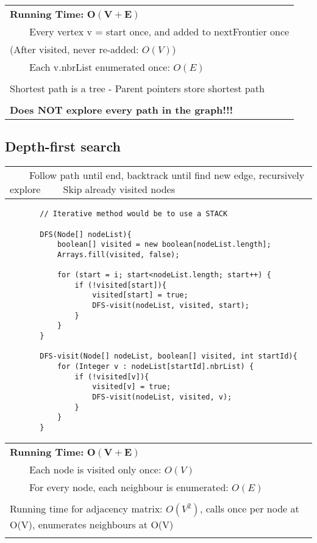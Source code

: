 \documentclass{article}
\newcommand{\tabitem}{~~\llap{\textbullet}~~}
\begin{document}
    \begin{tabular}{l}
        \textbf{Running Time:} $\bm{O(V + E)}$\\
        \tabitem Every vertex v = start once, and added to nextFrontier once \\
        (After visited, never re-added: $O(V)$)\\
        \tabitem Each v.nbrList enumerated once: $O(E)$\\\\
        Shortest path is a tree - Parent pointers store shortest path\\\\
        \textbf{Does NOT explore every path in the graph!!!}\\ 
    \end{tabular}

    \pagebreak

    \subsection{Depth-first search}

    \begin{tabular}{l}
        \tabitem Follow path until end, backtrack until find new edge, recursively explore
        \tabitem Skip already visited nodes
    \end{tabular}

    \begin{verbatim}
        // Iterative method would be to use a STACK

        DFS(Node[] nodeList){
            boolean[] visited = new boolean[nodeList.length];
            Arrays.fill(visited, false);

            for (start = i; start<nodeList.length; start++) {
                if (!visited[start]){
                    visited[start] = true;
                    DFS-visit(nodeList, visited, start);
                }
            }
        }

        DFS-visit(Node[] nodeList, boolean[] visited, int startId){
            for (Integer v : nodeList[startId].nbrList) {
                if (!visited[v]){
                    visited[v] = true;
                    DFS-visit(nodeList, visited, v);
                }
            }
        }
    \end{verbatim}

    \begin{tabular}{l}
        \textbf{Running Time:} $\bm{O(V + E)}$\\
        \tabitem Each node is visited only once: $O(V)$\\
        \tabitem For every node, each neighbour is enumerated: $O(E)$\\\\
        Running time for adjacency matrix: $O(V^{2})$, calls once per node at O(V), enumerates neighbours at O(V)\\\\
    \end{tabular}
\end{document}
